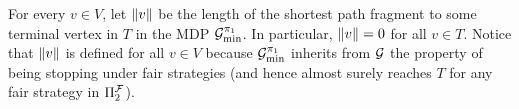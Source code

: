 \begin{myproof}

  
  For every $v\in V$, let ${\lVert{v}\rVert}$ be the length of the shortest
  path fragment to some terminal vertex in $T$ in the MDP
  $\mathcal{G}^{\pi_{1}}_{\min}$.   In
  particular, ${\lVert{v}\rVert}=0$ for all $v\in T$.  Notice that ${\lVert{v}\rVert}$ is defined for all
  $v\in V$ because $\mathcal{G}^{\pi_{1}}_{\min}$ inherits from $\mathcal{G}$ the
  property of being stopping under fair strategies (and hence almost
  surely reaches $T$ for any fair strategy in $\Pi^{\mathcal{F}}_{2}$).
  

\end{myproof}
